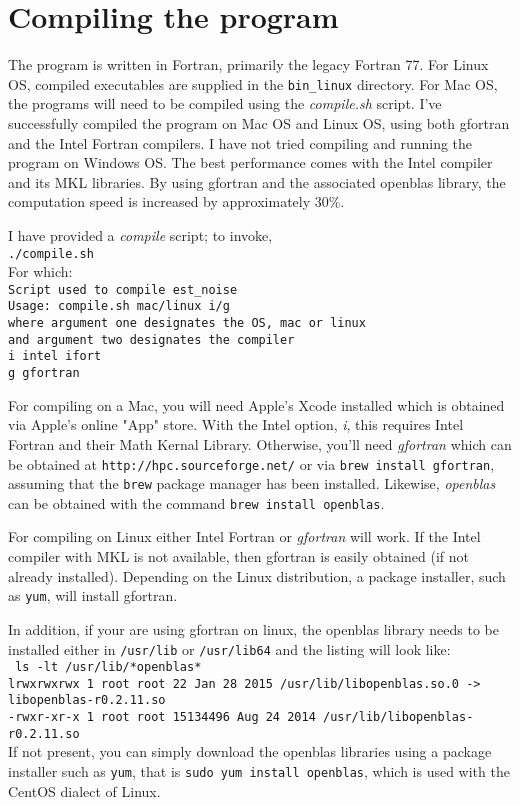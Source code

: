 \documentclass[12pt]{amsart}
\begin{document}
\section{Compiling the program}

The program is written in Fortran, primarily the legacy Fortran 77. For Linux OS, compiled executables are supplied in the
\texttt{bin\_linux} directory.  For Mac OS, the programs will need to be compiled using the \textit{compile.sh} script.
I've successfully
compiled the program on Mac OS and Linux OS, using both gfortran and the Intel Fortran compilers. 
I have not tried compiling and running the program on Windows OS. The best performance
comes with the Intel compiler and its MKL libraries.  By using gfortran and the associated openblas library, the computation speed is increased by approximately 30\%.  

I have provided a \textit{compile} script; to invoke,
\\
\texttt{./compile.sh}
\\
For which:
\\
\texttt{Script used to compile est\_noise \\
Usage:  compile.sh mac/linux i/g  \\
  where argument one designates the OS, mac or linux  \\
    and argument two designates the compiler \\
    i   intel ifort  \\
    g   gfortran
}

For compiling on a Mac, you will need Apple's Xcode installed which is obtained via Apple's online "App" store.
With the Intel option, \textit{i},
this requires Intel Fortran and their Math Kernal Library.  Otherwise, you'll need \textit{gfortran} which can
be obtained at \texttt{http://hpc.sourceforge.net/} or via \texttt{brew install gfortran}, assuming that the \texttt{brew} package
manager has been installed. Likewise, \textit{openblas} can be obtained with the command  \texttt{brew install openblas}.

For compiling on Linux either Intel Fortran or \textit{gfortran} will work.  If the Intel compiler with MKL
is not available, then gfortran is easily obtained (if not already installed).  Depending on the Linux
distribution, a package installer, such as \texttt{yum}, will install gfortran.

In addition, if your are using gfortran on linux, the openblas library needs to be installed either in  \texttt{/usr/lib} or \texttt{/usr/lib64} and the listing will look like:
\\
\tiny{
\texttt{
ls -lt /usr/lib/*openblas*
\\
lrwxrwxrwx 1 root root       22 Jan 28  2015 /usr/lib/libopenblas.so.0 -> libopenblas-r0.2.11.so
\\
-rwxr-xr-x 1 root root 15134496 Aug 24  2014 /usr/lib/libopenblas-r0.2.11.so
}
}
\normalsize{ }
\\
If not present, you can simply download the openblas libraries using a package installer such as \texttt{yum}, that
is \texttt{sudo yum install openblas}, which is used with the CentOS dialect of Linux. 
\end{document}
